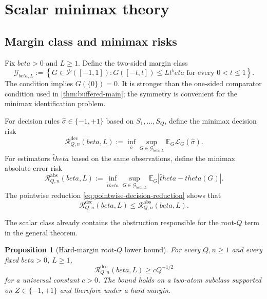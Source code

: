 \documentclass[11pt]{article}
\def\beta{beta}%
\def\theta{theta}%
\newtheorem{proposition}[theorem]{Proposition}
\newcommand{\E}{\mathbb E}
\newcommand{\calG}{\mathcal G}
\newcommand{\calR}{\mathcal R}
\newcommand\ced[1]{{\color{teal!70!black} #1}}
\begin{document}
\section{Scalar minimax theory}
\label{sec:scalar-minimax}

\subsection{Margin class and minimax risks}

Fix $\beta>0$ and $L\ge1$.  Define the two-sided margin class
\begin{equation}
\label{eq:Gclass}
\calG_{\beta,L}
:=
\left\{
G\in\mathcal P([-1,1]):
G([-t,t])\le Lt^\beta
\text{ for every }0<t\le1
\right\}.
\end{equation}
The condition implies $G(\{0\})=0$.  It is stronger than the one-sided comparator condition used in \cref{thm:buffered-main}; the symmetry is convenient for the minimax identification problem.

For decision rules $\widehat\sigma\in\{-1,+1\}$ based on $S_1,\dots,S_Q$, define the minimax decision risk
\begin{equation}
\label{eq:minimax-decision}
\calR^{\mathrm{dec}}_{Q,n}(\beta,L)
:=
\inf_{\widehat\sigma}
\sup_{G\in\calG_{\beta,L}}
\E_G\mathcal L_G(\widehat\sigma).
\end{equation}
For estimators $\widehat\theta$ based on the same observations, define the minimax absolute-error risk
\[
\calR^{\mathrm{abs}}_{Q,n}(\beta,L)
:=
\inf_{\widehat\theta}
\sup_{G\in\calG_{\beta,L}}
\E_G|\widehat\theta-\theta(G)|.
\]
\ced{The pointwise reduction \eqref{eq:pointwise-decision-reduction} shows that}
\begin{equation}
\label{eq:dec-le-abs}
\calR^{\mathrm{dec}}_{Q,n}(\beta,L)
\le
\calR^{\mathrm{abs}}_{Q,n}(\beta,L).
\end{equation}

The scalar class already contains the obstruction responsible for the root-$Q$ term in the general theorem.

\begin{proposition}[Hard-margin root-$Q$ lower bound]
\label{thm:rootQ-scalar}
For every $Q,n\ge1$ and every fixed $\beta>0$, $L\ge1$,
\begin{equation}
\label{eq:rootQ-scalar}
\calR^{\mathrm{dec}}_{Q,n}(\beta,L)
\ge cQ^{-1/2}
\end{equation}
for a universal constant $c>0$.  The bound holds on a two-atom subclass supported on $Z\in\{-1,+1\}$ and therefore under a hard margin.
\end{proposition}
\end{document}
